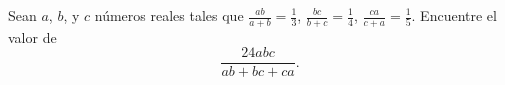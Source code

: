 Sean $a$, $b$, y $c$ números reales tales que $\frac{ab}{a+b}=\frac{1}{3}$, $\frac{bc}{b+c}=\frac{1}{4}$, $\frac{ca}{c+a}=\frac{1}{5}$. Encuentre el valor de \[\frac{24abc}{ab+bc+ca}.\]
